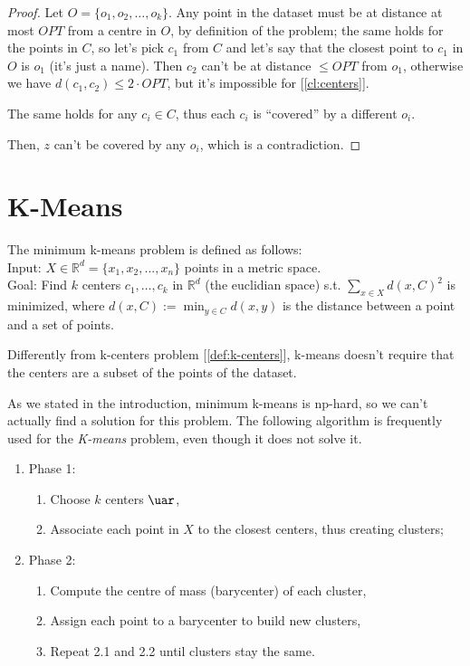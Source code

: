 \begin{proof}
    Let $O = \{o_1, o_2, \ldots, o_k\}$. Any point in the dataset must be at distance at most $OPT$ from a centre in $O$, by definition of the problem; the same holds for the points in $C$, so let's pick $c_1$ from $C$ and let's say that the closest point to $c_1$ in $O$ is $o_1$ (it's just a name). Then $c_2$ can't be at distance $\leq OPT$ from $o_1$, otherwise we have $d(c_1, c_2) \leq 2 \cdot OPT$, but it's impossible for [\ref{cl:centers}].
    
    The same holds for any $c_i \in C$, thus each $c_i$ is ``covered'' by a different $o_i$.
    
    Then, $z$ can't be covered by any $o_i$, which is a contradiction.
\end{proof}


\section{K-Means}\label{sec:k-means}

\begin{defn}\label{def:k-means}
    The minimum k-means problem is defined as follows:\\
    Input: $X \in \mathbb{R}^d = \{x_1, x_2, ..., x_n\}$ points in a metric space.\\
    Goal: Find $k$ centers $c_1, \dots, c_k$ in $\mathbb{R}^d$ (the euclidian space) s.t. $\sum_{x \in X} d(x,C)^2$ is minimized, where $d(x,C) := \min_{y \in C} d(x,y)$ is the distance between a point and a set of points.
\end{defn}

\obs Differently from k-centers problem [\ref{def:k-centers}], k-means doesn't require that the centers are a subset of the points of the dataset.

\obs As we stated in the introduction, minimum k-means is np-hard, so we can't actually find a solution for this problem. The following algorithm is frequently used for the \textit{K-means} problem, even though it does not solve it.

\begin{enumerate}
    \item Phase 1:
    \begin{enumerate}
        \item Choose $k$ centers $\uar$,
        \item Associate each point in $X$ to the closest centers, thus creating clusters;
    \end{enumerate}
    \item Phase 2:
    \begin{enumerate}
        \item Compute the centre of mass (barycenter) of each cluster,
        \item Assign each point to a barycenter to build new clusters,
        \item Repeat 2.1 and 2.2 until clusters stay the same.
    \end{enumerate}
\end{enumerate}

